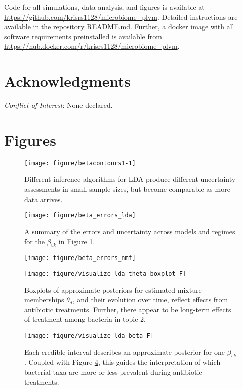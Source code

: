\documentclass[oupdraft]{bio}
\begin{document}
Code for all simulations, data analysis, and figures is available at
\url{https://github.com/krisrs1128/microbiome_plvm}. Detailed instructions are
available in the repository README.md. Further, a docker image with all software
requirements preinstalled is available from
\url{https://hub.docker.com/r/krisrs1128/microbiome_plvm}.

\section*{Acknowledgments}

{\it Conflict of Interest}: None declared.




\section{Figures}

\begin{figure}[!p]
  \centering\texttt{[image: figure/betacontours1-1]}
  \caption{Different inference algorithms for LDA produce different uncertainty
    assessments in small sample sizes, but become comparable as more data arrives.}
  \label{fig:lda_contours}
\end{figure}

\begin{figure}[!p]
  \centering
  \texttt{[image: figure/beta\_errors\_lda]}
  \caption{A summary of the errors and uncertainty across models and regimes for
    the $\beta_{vk}$ in Figure
    \ref{fig:lda_contours}. \label{fig:beta_errors_lda} }
\end{figure}

\begin{figure}[!p]
  \centering
  \texttt{[image: figure/beta\_errors\_nmf]}
  \caption{\label{fig:zinf_errors_beta} }
\end{figure}

\begin{figure}[!p]
  \centering\texttt{[image: figure/visualize\_lda\_theta\_boxplot-F]}
  \caption{Boxplots of approximate posteriors for estimated mixture memberships $\theta_{d}$,
    and their evolution over time, reflect effects from antibiotic treatments.
    Further, there appear to be long-term effects of treatment among bacteria in
    topic 2.
  \label{fig:antibiotics_lda_theta}}
\end{figure}

\begin{figure}[!p]
  \centering\texttt{[image: figure/visualize\_lda\_beta-F]}
  \caption{Each credible interval describes an approximate posterior for one
    $\beta_{vk}$. Coupled with Figure \ref{fig:antibiotics_lda_theta}, this
    guides the interpretation of which bacterial taxa are more or less prevalent
    during antibiotic treatments.} \label{fig:antibiotics_lda_beta}
\end{figure}
\end{document}
